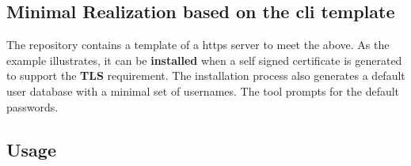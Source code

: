 \documentclass[12pt, a4paper]{article} %
\begin{document}
\subsection{Minimal Realization based on the cli template}

The repository contains a template of a https server to meet the above. As the example illustrates, it can be \textbf{installed} when a self signed certificate is generated to support the \textbf{TLS} requirement. The installation process also generates a default user database with a minimal set of usernames. The tool prompts for the default passwords.

\subsection{Usage}
\end{document}
